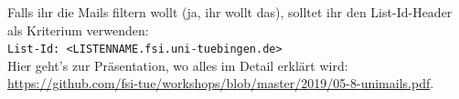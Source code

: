 Falls ihr die Mails filtern wollt (ja, ihr wollt das), solltet ihr den List-Id-Header als Kriterium verwenden: \\
\texttt{List-Id: <LISTENNAME.fsi.uni-tuebingen.de>} \\
Hier geht's zur Präsentation, wo alles im Detail erklärt wird: \url{https://github.com/fsi-tue/workshops/blob/master/2019/05-8-unimails.pdf}.
